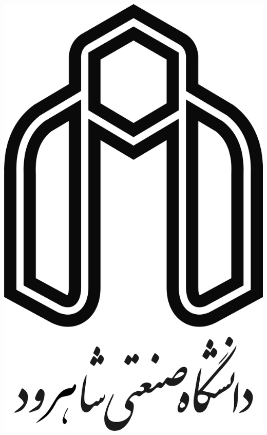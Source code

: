 
\begin{center}

\includegraphics[scale=0.17]{images/logo.png}

\vspace{0.5cm}
\ThesisUniversity \\[-0.3em]
\vspace{0.5cm}
\ThesisDepartment\\

\begin{large}
\vspace{0.5cm}




\end{large}
\end{center}
